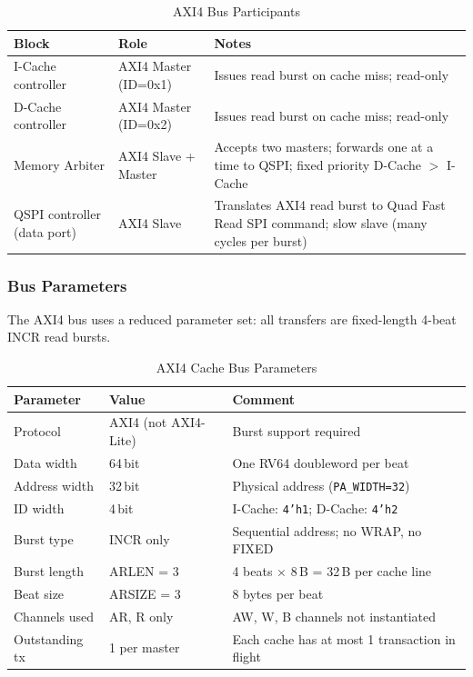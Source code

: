 \begin{table}[H]
\caption{AXI4 Bus Participants}
\label{tab:asAxi4Participants}
\centering
\begin{tabularx}{\textwidth}{|l |l |X|}
  \hline
  Block & Role & Notes \\
  \hline
  \hline
  I-Cache controller & AXI4 Master (ID=0x1) &
    Issues read burst on cache miss; read-only \\
  \hline
  D-Cache controller & AXI4 Master (ID=0x2) &
    Issues read burst on cache miss; read-only \\
  \hline
  Memory Arbiter     & AXI4 Slave + Master &
    Accepts two masters; forwards one at a time to QSPI;
    fixed priority D-Cache $>$ I-Cache \\
  \hline
  QSPI controller (data port) & AXI4 Slave &
    Translates AXI4 read burst to Quad Fast Read SPI command;
    slow slave (many cycles per burst) \\
  \hline
\end{tabularx}
\end{table}

\subsubsection{Bus Parameters}

The AXI4 bus uses a reduced parameter set:
all transfers are fixed-length 4-beat INCR read bursts.

\begin{table}[H]
\caption{AXI4 Cache Bus Parameters}
\label{tab:asAxi4BusParams}
\centering
\begin{tabularx}{\textwidth}{|l |l |X|}
  \hline
  Parameter & Value & Comment \\
  \hline
  \hline
  Protocol       & AXI4 (not AXI4-Lite)   & Burst support required \\
  \hline
  Data width     & 64\,bit                 & One RV64 doubleword per beat \\
  \hline
  Address width  & 32\,bit                 & Physical address (\texttt{PA\_WIDTH=32}) \\
  \hline
  ID width       & 4\,bit                  & I-Cache: \texttt{4'h1}; D-Cache: \texttt{4'h2} \\
  \hline
  Burst type     & INCR only               & Sequential address; no WRAP, no FIXED \\
  \hline
  Burst length   & ARLEN = 3               & 4 beats $\times$ 8\,B = 32\,B per cache line \\
  \hline
  Beat size      & ARSIZE = 3              & 8 bytes per beat \\
  \hline
  Channels used  & AR, R only              & AW, W, B channels not instantiated \\
  \hline
  Outstanding tx & 1 per master            & Each cache has at most 1 transaction in flight \\
  \hline
\end{tabularx}
\end{table}

